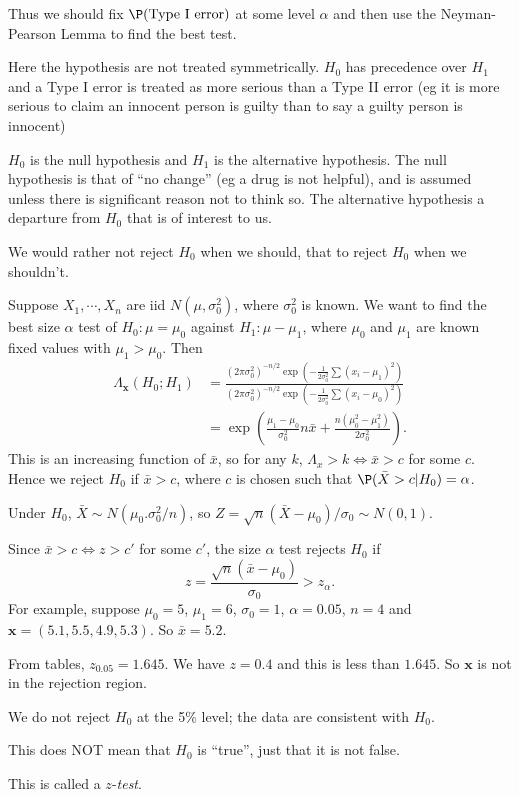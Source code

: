 \documentclass[a4paper]{article}
\begin{document}
Thus we should fix $\P(\text{Type I error})$ at some level $\alpha$ and then use the Neyman-Pearson Lemma to find the best test.

Here the hypothesis are not treated symmetrically. $H_0$ has precedence over $H_1$ and a Type I error is treated as more serious than a Type II error (eg it is more serious to claim an innocent person is guilty than to say a guilty person is innocent)

\begin{defi}
  $H_0$ is the null hypothesis and $H_1$ is the alternative hypothesis. The null hypothesis is that of ``no change'' (eg a drug is not helpful), and is assumed unless there is significant reason not to think so. The alternative hypothesis a departure from $H_0$ that is of interest to us.

  We would rather not reject $H_0$ when we should, that to reject $H_0$ when we shouldn't.
\end{defi}

\begin{eg}
  Suppose $X_1, \cdots, X_n$ are iid $N(\mu, \sigma_0^2)$, where $\sigma_0^2$ is known. We want to find the best size $\alpha$ test of $H_0: \mu = \mu_0$ against $H_1: \mu - \mu_1$, where $\mu_0$ and $\mu_1$ are known fixed values with $\mu_1 > \mu_0$. Then
  \begin{align*}
    \Lambda_\mathbf{x}(H_0; H_1) &= \frac{(2\pi\sigma_0^2)^{-n/2}\exp\left(-\frac{1}{2\sigma^2_0}\sum(x_i - \mu_1)^2\right)}{(2\pi\sigma_0^2)^{-n/2}\exp\left(-\frac{1}{2\sigma^2_0}\sum(x_i - \mu_0)^2\right)}\\
    &= \exp\left(\frac{\mu_1 - \mu_0}{\sigma_0^2}n\bar x + \frac{n(\mu_0^2 - \mu_1^2)}{2\sigma_0^2}\right).
  \end{align*}
  This is an increasing function of $\bar x$, so for any $k$, $\Lambda_x > k\Leftrightarrow \bar x > c$ for some $c$. Hence we reject $H_0$ if $\bar x > c$, where $c$ is chosen such that $\P(\bar X > c | H_0) = \alpha$.

  Under $H_0$, $\bar X \sim N(\mu_0. \sigma_0^2/n)$, so $Z = \sqrt{n}(\bar X - \mu_0)/\sigma_0 \sim N(0, 1)$.

  Since $\bar x > c\Leftrightarrow z > c'$ for some $c'$, the size $\alpha$ test rejects $H_0$ if
  \[
    z = \frac{\sqrt{n}(\bar x - \mu_0)}{\sigma_0} > z_\alpha.
  \]
  For example, suppose $\mu_0 = 5$, $\mu_1 = 6$, $\sigma_0 = 1$, $\alpha = 0.05$, $n = 4$ and $\mathbf{x} = (5.1, 5.5, 4.9, 5.3)$. So $\bar x = 5.2$.

  From tables, $z_{0.05} = 1.645$. We have $z = 0.4$ and this is less than $1.645$. So $\mathbf{x}$ is not in the rejection region.

  We do not reject $H_0$ at the 5\% level; the data are consistent with $H_0$.

  This does NOT mean that $H_0$ is ``true'', just that it is not false.

  This is called a $z$-\emph{test}.
\end{eg}
\end{document}
